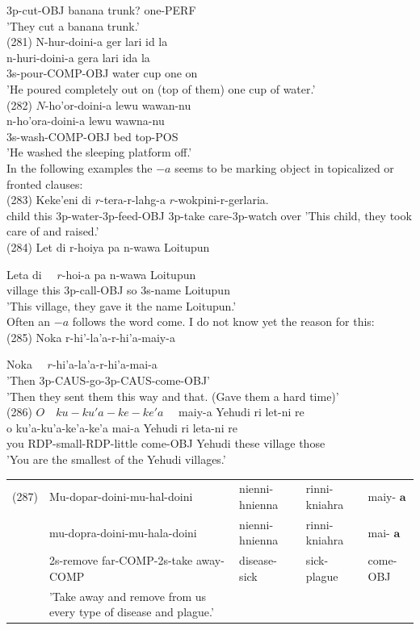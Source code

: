 \documentclass[10pt]{article}
\begin{document}
3p-cut-OBJ banana trunk? one-PERF\\
'They cut a banana trunk.'\\
(281) N-hur-doini-a ger lari id la\\
n-huri-doini-a gera lari ida la\\
3s-pour-COMP-OBJ water cup one on\\
'He poured completely out on (top of them) one cup of water.'\\
(282) \(N\)-ho'or-doini-a lewu wawan-nu\\
n-ho'ora-doini-a lewu wawna-nu\\
3s-wash-COMP-OBJ bed top-POS\\
'He washed the sleeping platform off.'\\
In the following examples the \(-a\) seems to be marking object in topicalized or fronted clauses:\\
(283) Keke'eni di \(r\)-tera-r-lahg-a \(r\)-wokpini-r-gerlaria.\\
child this 3p-water-3p-feed-OBJ 3p-take care-3p-watch over 'This child, they took care of and raised.'\\
(284) Let di r-hoiya pa n-wawa Loitupun

Leta di \(\quad r\)-hoi-a pa n-wawa Loitupun\\
village this 3p-call-OBJ so 3s-name Loitupun\\
'This village, they gave it the name Loitupun.'\\
Often an \(-a\) follows the word come. I do not know yet the reason for this:\\
(285) Noka r-hi'-la'a-r-hi'a-maiy-a

Noka \(\quad r\)-hi'a-la'a-r-hi'a-mai-a\\
'Then 3p-CAUS-go-3p-CAUS-come-OBJ'\\
'Then they sent them this way and that. (Gave them a hard time)'\\
(286) \(O \quad k u-k u ' a-k e-k e ' a \quad\) maiy-a Yehudi ri let-ni re\\
o ku'a-ku'a-ke'a-ke'a mai-a Yehudi ri leta-ni re\\
you RDP-small-RDP-little come-OBJ Yehudi these village those\\
'You are the smallest of the Yehudi villages.'

\begin{center}
\begin{tabular}{lllll}
(287) & Mu-dopar-doini-mu-hal-doini & nienni-hnienna & rinni-kniahra & maiy- \(\boldsymbol{a}\) \\
 & mu-dopra-doini-mu-hala-doini & nienni-hnienna & rinni-kniahra & mai- \(\boldsymbol{a}\) \\
 & 2s-remove far-COMP-2s-take away-COMP & disease-sick & sick-plague & come-OBJ \\
 & 'Take away and remove from us every type of disease and plague.' &  &  &  \\
\end{tabular}
\end{center}
\end{document}
